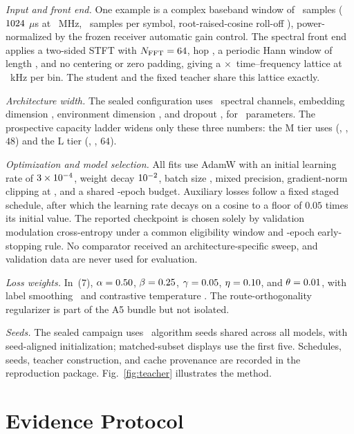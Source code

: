 \documentclass[letterpaper,journal]{IEEEtran}
\begin{document}
\emph{Input and front end.} One example is a complex baseband window of
\WindowSamples\ samples ($1024$ $\mu$s at \SampleRateMHz\ MHz,
\SamplesPerSymbol\ samples per symbol, root-raised-cosine roll-off
\RrcRolloff), power-normalized by the frozen receiver automatic gain control. The spectral
front end
applies a two-sided STFT with $N_{\mathrm{FFT}}=64$, hop \HopLength, a
periodic Hann window of length \NFft, and no centering or zero padding, giving
a \StftBins$\times$\StftFrames\ time--frequency lattice at \StftBinHz\ kHz per
bin. The student and the fixed teacher share this lattice exactly.

\emph{Architecture width.} The sealed configuration uses \SpectralChannels\
spectral channels, embedding dimension \EmbeddingDim, environment dimension
\EnvironmentDim, and dropout \DropoutRate, for \ParamsAFive\ parameters. The
prospective capacity ladder widens only these three numbers: the M tier uses
(\CapacityMSpectral, \CapacityMEmbedding, $48$) and the L tier
(\CapacityLSpectral, \CapacityLEmbedding, $64$).

\emph{Optimization and model selection.} All fits use AdamW with an initial
learning rate of $3\times10^{-4}$, weight decay $10^{-2}$, batch size
\TrainBatch, mixed precision, gradient-norm clipping at \GradClip, and a shared
\TrainEpochs-epoch budget. Auxiliary losses follow a fixed staged schedule,
after which the learning rate decays on a cosine to a floor of $0.05$ times
its initial value. The reported checkpoint is chosen solely by validation
modulation cross-entropy under a common eligibility window and
\TrainPatience-epoch early-stopping rule. No comparator received an
architecture-specific sweep, and validation data are never used for
evaluation.

\emph{Loss weights.} In~(7), $\alpha=0.50$, $\beta=0.25$,
$\gamma=0.05$, $\eta=0.10$, and $\theta=0.01$, with label
smoothing \LabelSmoothing\ and contrastive temperature \ContrastTemp. The
route-orthogonality regularizer is part of the A5 bundle but not isolated.

\emph{Seeds.} The sealed campaign uses \ProtocolSeedCount\ algorithm seeds
shared across all models, with seed-aligned initialization; matched-subset
displays use the first five. Schedules, seeds, teacher construction, and
cache provenance are recorded in the reproduction package.
Fig.~\ref{fig:teacher} illustrates the method.

\section{Evidence Protocol}
\end{document}
